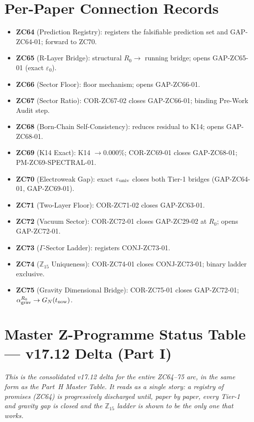 \documentclass[12pt, a4paper]{article}
\begin{document}
\section{Per-Paper Connection Records}
\label{sec:xlviii-records}

\begin{conmapbox}[title={ZC64--75 Connection Records}]
\begin{itemize}[leftmargin=1.5em]
\item \textbf{ZC64} (Prediction Registry): registers the falsifiable
  prediction set and GAP-ZC64-01; forward to ZC70.
\item \textbf{ZC65} (R-Layer Bridge): structural $R_0\to$ running bridge;
  opens GAP-ZC65-01 (exact $\varepsilon_0$).
\item \textbf{ZC66} (Sector Floor): floor mechanism; opens GAP-ZC66-01.
\item \textbf{ZC67} (Sector Ratio): COR-ZC67-02 closes GAP-ZC66-01; binding
  Pre-Work Audit step.
\item \textbf{ZC68} (Born-Chain Self-Consistency): reduces residual to K14;
  opens GAP-ZC68-01.
\item \textbf{ZC69} (K14 Exact): K14 $\to 0.000\%$; COR-ZC69-01 closes
  GAP-ZC68-01; PM-ZC69-SPECTRAL-01.
\item \textbf{ZC70} (Electroweak Gap): exact $\varepsilon_{\rm univ}$ closes
  both Tier-1 bridges (GAP-ZC64-01, GAP-ZC69-01).
\item \textbf{ZC71} (Two-Layer Floor): COR-ZC71-02 closes GAP-ZC63-01.
\item \textbf{ZC72} (Vacuum Sector): COR-ZC72-01 closes GAP-ZC29-02 at
  $R_0$; opens GAP-ZC72-01.
\item \textbf{ZC73} ($\Gamma$-Sector Ladder): registers CONJ-ZC73-01.
\item \textbf{ZC74} ($\mathbb{Z}_{15}$ Uniqueness): COR-ZC74-01 closes
  CONJ-ZC73-01; binary ladder exclusive.
\item \textbf{ZC75} (Gravity Dimensional Bridge): COR-ZC75-01 closes
  GAP-ZC72-01; $\alpha_{\rm grav}^{R_0}\to G_N(t_{\rm now})$.
\end{itemize}
\end{conmapbox}


\section{Master Z-Programme Status Table --- v17.12 Delta (Part I)}
\label{sec:xlviii-master}

\noindent
\textit{This is the consolidated v17.12 delta for the entire ZC64--75 arc,
in the same form as the Part~H Master Table. It reads as a single story:
a registry of promises (ZC64) is progressively discharged until, paper by
paper, every Tier-1 and gravity gap is closed and the $\mathbb{Z}_{15}$
ladder is shown to be the only one that works.}
\end{document}
